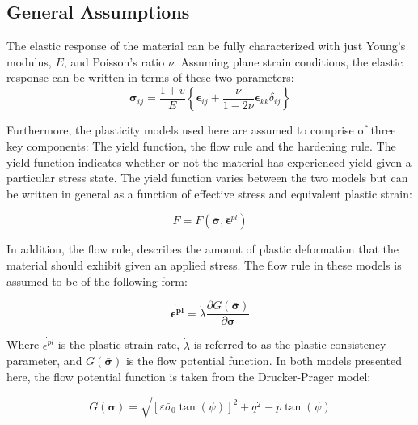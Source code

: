 \subsection{General Assumptions}
The elastic response of the material can be fully characterized with just Young's modulus, $E$, and Poisson's ratio $\nu$. Assuming plane strain conditions, the elastic response can be written in terms of these two parameters:
\begin{equation}
\boldsymbol{\sigma}_{ij}=\frac{1+v}{E}\left\{\boldsymbol{\epsilon}_{ij}+\frac{\nu}{1-2\nu}\boldsymbol{\epsilon}_{kk}\delta_{ij}\right\}
\label{eqn:const8a}
\end{equation}

Furthermore, the plasticity models used here are assumed to comprise of three key components: The yield function, the flow rule and the hardening rule. The yield function indicates whether or not the material has experienced yield given a particular stress state. The yield function varies between the two models but can be written in general as a function of effective stress and equivalent plastic strain:

\begin{equation}
    F = 
    F
    \left(
        \boldsymbol{\bar{\sigma}},\bar{\boldsymbol{\epsilon}}^{pl}
    \right)
\label{eqn:const8c}
\end{equation}

In addition, the flow rule, describes the amount of plastic deformation that the material should exhibit given an applied stress. The flow rule in these models is assumed to be of the following form:

\begin{equation}
\dot{\boldsymbol{\epsilon^{pl}}}=\dot{\lambda} \frac{\partial G\left(\bar{\boldsymbol{\sigma}}\right)}{\partial \boldsymbol{\sigma}}
\label{eqn:const8b}
\end{equation}

Where $\dot{\epsilon^{pl}}$ is the plastic strain rate, $\dot{\lambda}$ is referred to as the plastic consistency parameter, and $G\left(\bar{\boldsymbol{\sigma}}\right)$ is the flow potential function. In both models presented here, the flow potential function is taken from the Drucker-Prager model:

\begin{equation}
G\left(\boldsymbol{\sigma}\right)=\sqrt{\left[\varepsilon\bar{\sigma}_{0}\tan\left(\psi\right)\right]^{2}+q^{2}}-p\tan\left(\psi\right)\label{eqn:const11}
\end{equation}

